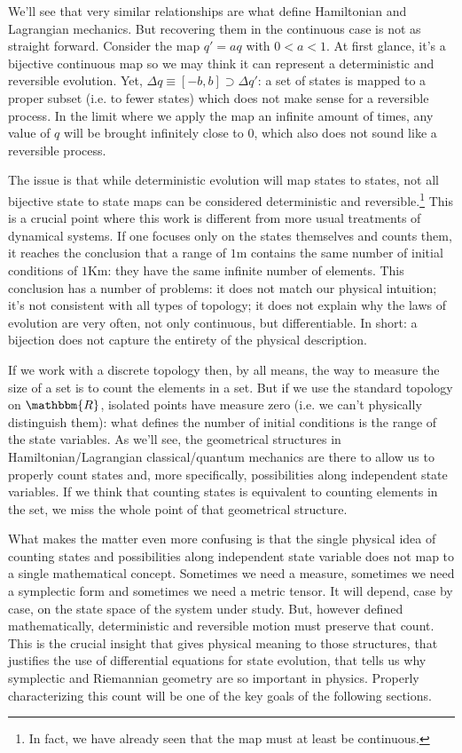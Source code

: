 \documentclass[aps,pra,10pt,twocolumn,floatfix,nofootinbib]{revtex4-1}
\numberwithin{equation}{section}
\theoremstyle{definition}
\begin{document}
We'll see that very similar relationships are what define Hamiltonian and Lagrangian mechanics. But recovering them in the continuous case is not as straight forward. Consider the map $q'=aq$ with $0<a<1$. At first glance, it's a bijective continuous map so we may think it can represent a deterministic and reversible evolution. Yet, $\Delta q \equiv [-b, b] \supset \Delta q'$: a set of states is mapped to a proper subset (i.e. to fewer states) which does not make sense for a reversible process. In the limit where we apply the map an infinite amount of times, any value of $q$ will be brought infinitely close to $0$, which also does not sound like a reversible process.

The issue is that while deterministic evolution will map states to states, not all bijective state to state maps can be considered deterministic and reversible.\footnote{In fact, we have already seen that the map must at least be continuous.} This is a crucial point where this work is different from more usual treatments of dynamical systems. If one focuses only on the states themselves and counts them, it reaches the conclusion that a range of $1$m contains the same number of initial conditions of $1$Km: they have the same infinite number of elements. This conclusion has a number of problems: it does not match our physical intuition; it's not consistent with all types of topology; it does not explain why the laws of evolution are very often, not only continuous, but differentiable. In short: a bijection does not capture the entirety of the physical description.

If we work with a discrete topology then, by all means, the way to measure the size of a set is to count the elements in a set. But if we use the standard topology on $\mathbbm{R}$, isolated points have measure zero (i.e. we can't physically distinguish them): what defines the number of initial conditions is the range of the state variables. As we'll see, the geometrical structures in Hamiltonian/Lagrangian classical/quantum mechanics are there to allow us to properly count states and, more specifically, possibilities along independent state variables. If we think that counting states is equivalent to counting elements in the set, we miss the whole point of that geometrical structure.

What makes the matter even more confusing is that the single physical idea of counting states and possibilities along independent state variable does not map to a single mathematical concept. Sometimes we need a measure, sometimes we need a symplectic form and sometimes we need a metric tensor. It will depend, case by case, on the state space of the system under study. But, however defined mathematically, deterministic and reversible motion must preserve that count. This is the crucial insight that gives physical meaning to those structures, that justifies the use of differential equations for state evolution, that tells us why symplectic and Riemannian geometry are so important in physics. Properly characterizing this count will be one of the key goals of the following sections.
\end{document}
